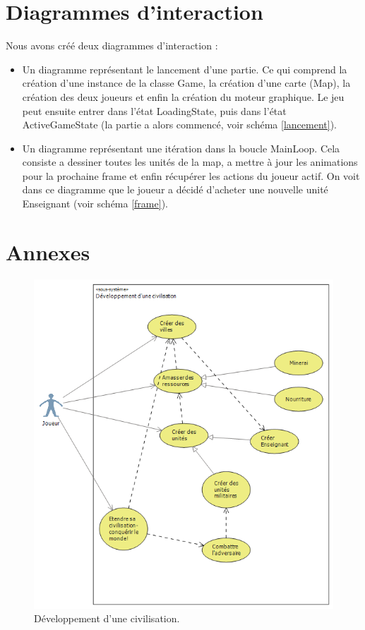 \section{Diagrammes d'interaction}
Nous avons créé deux diagrammes d'interaction :
\begin{itemize}
\item Un diagramme représentant le lancement d'une partie. Ce qui comprend la création d'une instance de la classe Game, la création d'une carte (Map), la création des deux joueurs et enfin la création du moteur graphique. Le jeu peut ensuite entrer dans l'état LoadingState, puis dans l'état ActiveGameState (la partie a alors commencé, voir schéma \ref{lancement}).
\item Un diagramme représentant une itération dans la boucle MainLoop. Cela consiste a dessiner toutes les unités de la map, a mettre à jour les animations pour la prochaine frame et enfin récupérer les actions du joueur actif. On voit dans ce diagramme que le joueur a décidé d'acheter une nouvelle unité Enseignant (voir schéma \ref{frame}).
\end{itemize}

\section{Annexes}
\begin{figure}
    \begin{center}  
    \includegraphics[width=\textwidth]{devci.png}
    \caption{Développement d'une civilisation.}
    \label{devci}
\end{center}
\end{figure}

